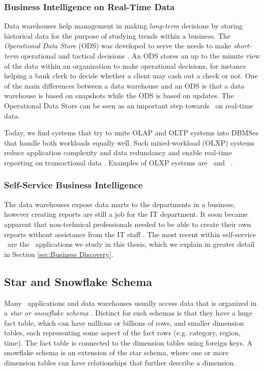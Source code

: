 \subsubsection{Business Intelligence on Real-Time Data}
Data warehouses help management in making \textit{long-term} decisions by storing historical data for the purpose of studying trends within a business. The \textit{Operational Data Store} (ODS) was developed to serve the needs to make \textit{short-term} operational and tactical decisions \cite{Pavlic2002-nm}. An ODS stores an up to the minute view of the data within an organization to make operational decisions, for instance helping a bank clerk to decide whether a client may cash out a check or not. One of the main differences between a data warehouse and an ODS is that a data warehouse is based on snapshots while the ODS is based on updates. The Operational Data Store can be seen as an important step towards \bi~on real-time data.

Today, we find systems that try to unite OLAP and OLTP systems into DBMSes that handle both workloads equally well. Such mixed-workload (OLXP) systems reduce application complexity and data redundancy and enable real-time reporting on transactional data \cite{Plattner2014-fr}. Examples of OLXP systems are \hyper~and \hyrise~\cite{Kemper2011-ap, Schwalb2014-hn}.

\subsubsection{Self-Service Business Intelligence}
The data warehouses expose data marts to the departments in a business, however creating reports are still a job for the IT department. It soon became apparent that non-technical professionals needed to be able to create their own reports without assistance from the IT staff \cite{noauthor_undated-fi}. The most recent within self-service \bi~are the \bd~applications we study in this thesis, which we explain in greater detail in Section \ref{sec:Business Discovery}.

\subsection{Star and Snowflake Schema}
\label{sub:Star and Snowflake Schema}
Many \bi~applications and data warehouses usually access data that is organized in a \textit{star or snowflake schema} \cite{Barber2012-xt}. Distinct for such schemas is that they have a huge fact table, which can have millions or billions of rows, and smaller dimension tables, each representing some aspect of the fact rows (e.g. category, region, time). The fact table is connected to the dimension tables using foreign keys. A snowflake schema is an extension of the star schema, where one or more dimension tables can have relationships that further describe a dimension.

